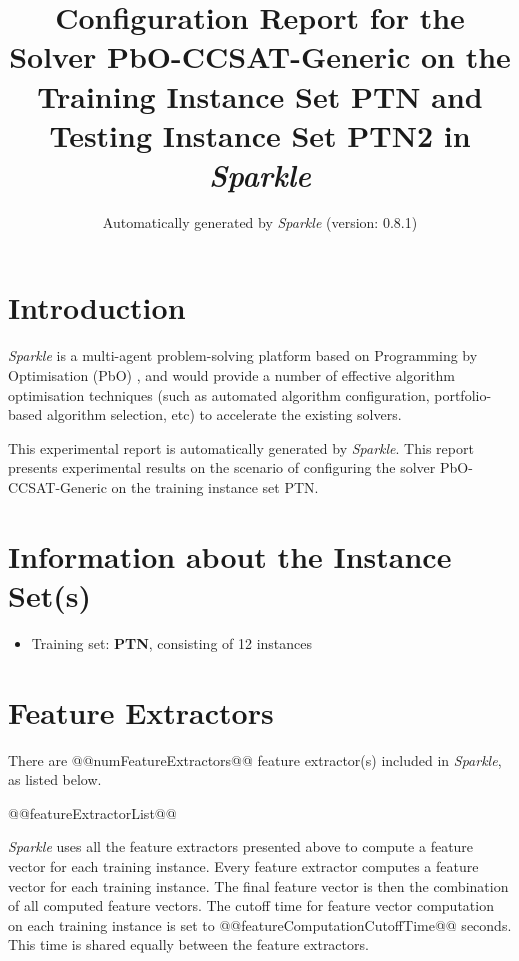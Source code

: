 \documentclass[british]{article}
\title{Configuration Report for the Solver PbO-CCSAT-Generic on the Training Instance Set PTN \iftest and Testing Instance Set PTN2 \fi in \emph{Sparkle} }
\author{ Automatically generated by \emph{Sparkle} (version: 0.8.1) }
\newif\iftest
\newif\iffeatures
\begin{document}
\maketitle %


\section{Introduction}
\label{sec:Introduction}

\emph{Sparkle} \cite{Hoos15} is a multi-agent problem-solving platform based on Programming by Optimisation (PbO) \cite{Hoos12}, and would provide a number of effective algorithm optimisation techniques (such as automated algorithm configuration, portfolio-based algorithm selection, etc) to accelerate the existing solvers.

This experimental report is automatically generated by \emph{Sparkle}. This report presents experimental results on the scenario of configuring the solver PbO-CCSAT-Generic on the training instance set PTN\iftest~and evaluating it on the testing instance set PTN2\fi.


\section{Information about the Instance Set(s)}

\begin{itemize}
\item Training set: \textbf{PTN}, consisting of 12 instances
\iftest\item \textbf{PTN2}, consisting of 11 instances\fi
\end{itemize}


\iffeatures
    \section{Feature Extractors}
        There are @@numFeatureExtractors@@ feature extractor(s) included in \emph{Sparkle}, as listed below.

        \begin{enumerate}
        @@featureExtractorList@@
        \end{enumerate}

        \emph{Sparkle} uses all the feature extractors presented above to compute a feature vector for each training instance. Every feature extractor computes a feature vector for each training instance. The final feature vector is then the combination of all computed feature vectors. The cutoff time for feature vector computation on each training instance is set to @@featureComputationCutoffTime@@ seconds. This time is shared equally between the feature extractors.
\end{document}
